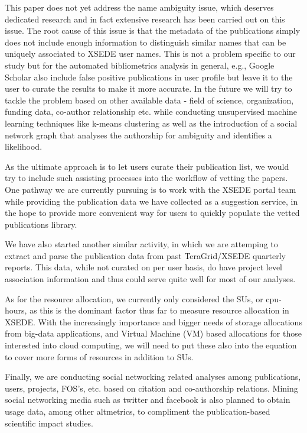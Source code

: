 \documentclass{tex/sig-alternate}
\begin{document}
This paper does not yet address the name ambiguity issue, which deserves dedicated research and in fact extensive research has been carried out on this issue. The root cause of this issue is that the metadata of the publications simply does not include enough information to distinguish similar names that can be uniquely associated to XSEDE user names. This is not a problem specific to our study but for the automated bibliometrics analysis in general, e.g., Google Scholar also include false positive publications in user profile but leave it to the user to curate the results to make it more accurate. In the future we will try to tackle the problem based on other available data - field of science, organization, funding data, co-author relationship etc. while conducting unsupervised machine learning techniques like k-means clustering as well as the introduction of a social network graph that analyses the authorship for ambiguity and identifies a likelihood.
 
As the ultimate approach is to let users curate their publication list, we would try to include such assisting processes into the workflow of vetting the papers. One pathway we are currently pursuing is to work with the XSEDE portal team while providing the publication data we have collected as a suggestion service, in the hope to provide more convenient way for users to quickly populate the vetted publications library. 
 
We have also started another similar activity, in which we are attemping to  extract and parse the publication data from past TeraGrid/XSEDE quarterly reports. This data, while not curated on per user basis, do have project level association information and thus could serve quite well for most of our analyses. 

As for the resource allocation, we currently only considered the SUs, or cpu-hours, as this is the dominant factor thus far to measure resource allocation in XSEDE. With the increasingly importance and bigger needs of storage allocations from big-data applications, and Virtual Machine (VM) based allocations for those interested into cloud computing, we will need to put these also into the equation to cover more forms of resources in addition to SUs.

Finally, we are conducting social networking related analyses among publications, users, projects, FOS's, etc. based on citation and co-authorship relations. Mining social networking media such as twitter and facebook is also planned to obtain usage data, among other altmetrics, to compliment the publication-based scientific impact studies.
\end{document}
